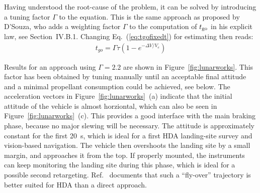 \documentclass[%
]{aiaa-tc}
\begin{document}
Having understood the root-cause of the problem, it can be solved by introducing
a tuning factor $\Gamma$ to the equation. This is the same approach as proposed
by D'Souza, who adds a weighting factor $\Gamma$ to the computation of $t_{\text{go}}$ in
his explicit law, see Section~IV.B.1.\cite{DSouza1997} Changing
Eq.~(\ref{eq:tgofixedt}) for estimating \tgo then reads:
\begin{align}
    t_{go} = \Gamma \tau \left( 1 - e^{-\Delta V/V_e} \right)
        \label{eq:tgogamma}
\end{align}

Results for an approach using $\Gamma=2.2$ are shown in
Figure~\ref{fig:lunarworks}. This factor has been obtained by tuning manually
until an acceptable final attitude and a minimal propellant consumption could be
achieved, see below. The acceleration vectors in Figure~\ref{fig:lunarworks}~(a)
indicate that the initial attitude of the vehicle is almost horziontal, which
can also be seen in Figure~\ref{fig:lunarworks}~(c). This provides a good
interface with the main braking phase, because no major slewing will be
necessary. The attitude is approximately constant for the first \SI{20}{s},
which is ideal for a first HDA landing-site survey and vision-based navigation.
The vehicle then overshoots the landing site by a small margin, and approaches
it from the top.  If properly mounted, the instruments can keep monitoring the
landing site during this phase, which is ideal for a possible second
retargeting. Ref.~ documents that such a ``fly-over''
trajectory is better suited for HDA than a direct approach.
\end{document}
